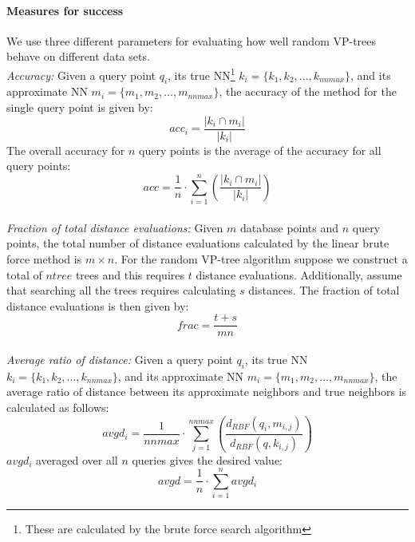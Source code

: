 \documentclass[11pt]{article}
\begin{document}
\paragraph{Measures for success} We use three different parameters for evaluating how well random VP-trees behave on different data sets.
\\
\emph{Accuracy:} Given a query point $q_i$, its true NN\footnote{These are calculated by the brute force search algorithm} $k_i = \{k_1, k_2, ..., k_{nnmax}\}$, and its approximate NN $m_i = \{m_1,m_2, ..., m_{nnmax}\}$, the accuracy of the method for the single query point is given by:
\begin{equation}
acc_i = \frac{|k_i \cap m_i|}{|k_i|}
\end{equation}
The overall accuracy for $n$ query points is the average of the accuracy for all query points:
\begin{equation}
acc = \frac{1}{n}\cdot\sum\limits_{i=1}^n \left(\frac{|k_i \cap m_i|}{|k_i|}\right)
\end{equation} 
\\
\emph{Fraction of total distance evaluations:} Given $m$ database points and $n$ query points, the total number of distance evaluations calculated by the linear brute force method is $m \times n$. For the random VP-tree algorithm suppose we construct a total of $ntree$ trees and this requires $t$ distance evaluations. Additionally, assume that searching all the trees requires calculating $s$ distances. The fraction of total distance evaluations is then given by:
\begin{equation}
frac = \frac{t + s}{mn}
\end{equation}
\\
\emph{Average ratio of distance:} Given a query point $q_i$, its true NN $k_i = \{k_1, k_2, ..., k_{nnmax}\}$, and its approximate NN $m_i = \{m_1,m_2, ..., m_{nnmax}\}$, the average ratio of distance between its approximate neighbors and true neighbors is calculated as follows:
\begin{equation}
avgd_i = \frac{1}{nnmax} \cdot \sum\limits_{j = 1}^{nnmax} \left(\frac{d_{RBF}(q_i,m_{i,j})}{d_{RBF}(q,k_{i,j})}\right)
\end{equation} 
$avgd_i$ averaged over all $n$ queries gives the desired value:
\begin{equation}
avgd = \frac{1}{n} \cdot \sum\limits_{i=1}^n avgd_i
\end{equation}
\end{document}
